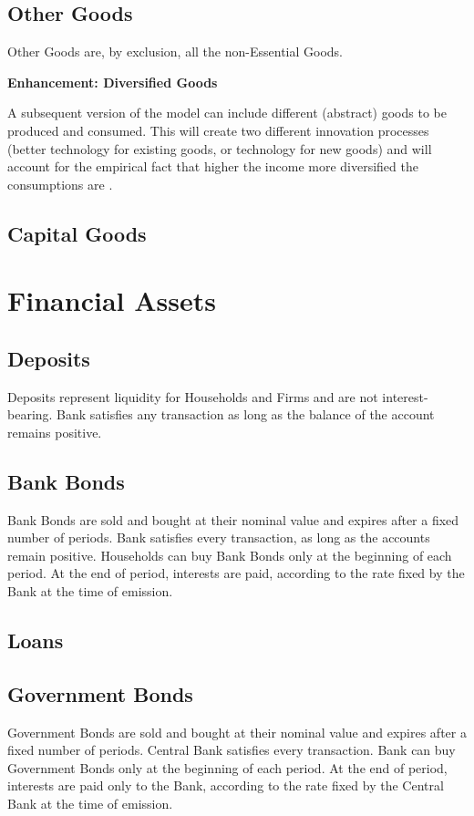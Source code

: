 \documentclass[a4paper, headings=standardclasses]{scrartcl}
\newenvironment{enh}[1][]{\begin{framed}\noindent\textbf{Enhancement: #1}\par}{\end{framed}}
\begin{document}
\subsection{Other Goods}
Other Goods are, by exclusion, all the non-Essential Goods.

\begin{enh}[Diversified Goods]
	A subsequent version of the model can include different (abstract) goods to be produced and consumed. This will  create two different innovation processes (better technology for existing goods, or technology for new goods) and will account for the empirical fact that higher the income more diversified the consumptions are \parencite[cfr.][§2]{didomenico2022}.
\end{enh}

\subsection{Capital Goods}

\section{Financial Assets}

\subsection{Deposits}
Deposits represent liquidity for Households and Firms and are not interest-bearing. Bank satisfies any transaction as long as the balance of the account remains positive.

\subsection{Bank Bonds}
Bank Bonds are sold and bought at their nominal value and expires after a fixed number of periods. Bank satisfies every transaction, as long as the accounts remain positive. Households can buy Bank Bonds only at the beginning of each period. At the end of period, interests are paid, according to the rate fixed by the Bank at the time of emission.

\subsection{Loans}

\subsection{Government Bonds}
Government Bonds are sold and bought at their nominal value and expires after a fixed number of periods. Central Bank satisfies every transaction. Bank can buy Government Bonds only at the beginning of each period. At the end of period, interests are paid only to the Bank, according to the rate fixed by the Central Bank at the time of emission.
\end{document}
